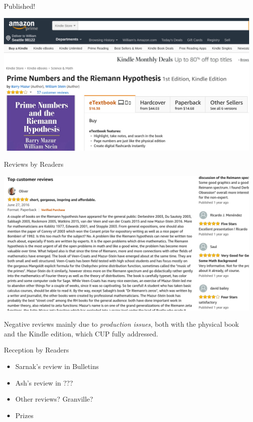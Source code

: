 \documentclass{beamer}
\begin{document}
\begin{frame}{Published!}

  \includegraphics[width=.98\textwidth]{pics/amazon-prime}

\end{frame}



\begin{frame}{Reviews by Readers}

  \includegraphics[width=.95\textwidth]{pics/amazon-review}

\hrulefill

  \vfill

  Negative reviews  mainly due to \textit{production issues},
  both with the physical book
  and the Kindle edition, which CUP fully addressed.

\end{frame}

\begin{frame}{Reception by Readers}
  \begin{itemize}
    \item Sarnak's review in Bulletins
    \item Ash's review in ???
    \item Other reviews?  Granville?
    \item Prizes
  \end{itemize}
\end{frame}
\end{document}
